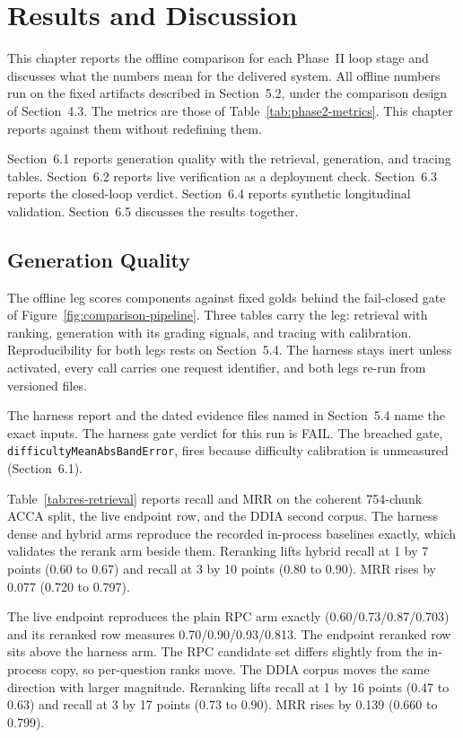 \chapter{Results and Discussion}
This chapter reports the offline comparison for each Phase~II loop stage and discusses what the numbers mean for the delivered system. All offline numbers run on the fixed artifacts described in Section~5.2, under the comparison design of Section~4.3. The metrics are those of Table~\ref{tab:phase2-metrics}. This chapter reports against them without redefining them.

Section~6.1 reports generation quality with the retrieval, generation, and tracing tables. Section~6.2 reports live verification as a deployment check. Section~6.3 reports the closed-loop verdict. Section~6.4 reports synthetic longitudinal validation. Section~6.5 discusses the results together.

\section{Generation Quality}
The offline leg scores components against fixed golds behind the fail-closed gate of Figure~\ref{fig:comparison-pipeline}. Three tables carry the leg: retrieval with ranking, generation with its grading signals, and tracing with calibration. Reproducibility for both legs rests on Section~5.4. The harness stays inert unless activated, every call carries one request identifier, and both legs re-run from versioned files.

The harness report and the dated evidence files named in Section~5.4 name the exact inputs. The harness gate verdict for this run is FAIL. The breached gate, \texttt{difficultyMeanAbsBandError}, fires because difficulty calibration is unmeasured (Section~6.1).

Table~\ref{tab:res-retrieval} reports recall and MRR on the coherent 754-chunk ACCA split, the live endpoint row, and the DDIA second corpus. The harness dense and hybrid arms reproduce the recorded in-process baselines exactly, which validates the rerank arm beside them. Reranking lifts hybrid recall at 1 by 7 points (0.60 to 0.67) and recall at 3 by 10 points (0.80 to 0.90). MRR rises by 0.077 (0.720 to 0.797).

The live endpoint reproduces the plain RPC arm exactly (0.60/0.73/0.87/0.703) and its reranked row measures 0.70/0.90/0.93/0.813. The endpoint reranked row sits above the harness arm. The RPC candidate set differs slightly from the in-process copy, so per-question ranks move. The DDIA corpus moves the same direction with larger magnitude. Reranking lifts recall at 1 by 16 points (0.47 to 0.63) and recall at 3 by 17 points (0.73 to 0.90). MRR rises by 0.139 (0.660 to 0.799).

